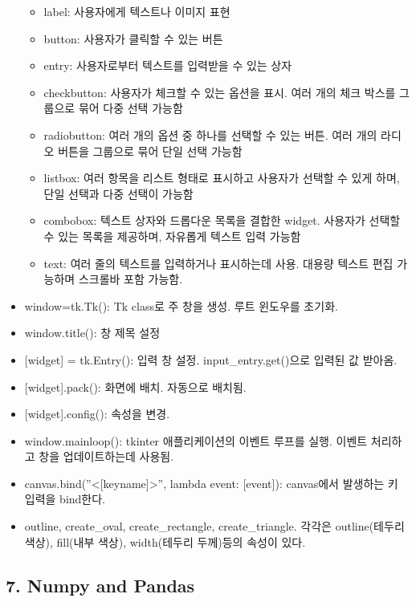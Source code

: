 \begin{itemize}
  \begin{itemize}
  \tightlist
  \item
    label: 사용자에게 텍스트나 이미지 표현
  \item
    button: 사용자가 클릭할 수 있는 버튼
  \item
    entry: 사용자로부터 텍스트를 입력받을 수 있는 상자
  \item
    checkbutton: 사용자가 체크할 수 있는 옵션을 표시. 여러 개의 체크
    박스를 그룹으로 묶어 다중 선택 가능함
  \item
    radiobutton: 여러 개의 옵션 중 하나를 선택할 수 있는 버튼. 여러 개의
    라디오 버튼을 그룹으로 묶어 단일 선택 가능함
  \item
    listbox: 여러 항목을 리스트 형태로 표시하고 사용자가 선택할 수 있게
    하며, 단일 선택과 다중 선택이 가능함
  \item
    combobox: 텍스트 상자와 드롭다운 목록을 결합한 widget. 사용자가
    선택할 수 있는 목록을 제공하며, 자유롭게 텍스트 입력 가능함
  \item
    text: 여러 줄의 텍스트를 입력하거나 표시하는데 사용. 대용량 텍스트
    편집 가능하며 스크롤바 포함 가능함.
  \end{itemize}
\item
  window=tk.Tk(): Tk class로 주 창을 생성. 루트 윈도우를 초기화.
\item
  window.title(): 창 제목 설정
\item
  {[}widget{]} = tk.Entry(): 입력 창 설정. input\_entry.get()으로 입력된
  값 받아옴.
\item
  {[}widget{]}.pack(): 화면에 배치. 자동으로 배치됨.
\item
  {[}widget{]}.config(): 속성을 변경.
\item
  window.mainloop(): tkinter 애플리케이션의 이벤트 루프를 실행. 이벤트
  처리하고 창을 업데이트하는데 사용됨.
\item
  canvas.bind(''\textless{[}keyname{]}\textgreater'', lambda event:
  {[}event{]}): canvas에서 발생하는 키 입력을 bind한다.
\item
  outline, create\_oval, create\_rectangle, create\_triangle. 각각은
  outline(테두리 색상), fill(내부 색상), width(테두리 두께)등의 속성이
  있다.
\end{itemize}



\hypertarget{numpy-and-pandas}{%
\subsection{7. Numpy and Pandas}\label{numpy-and-pandas}}

